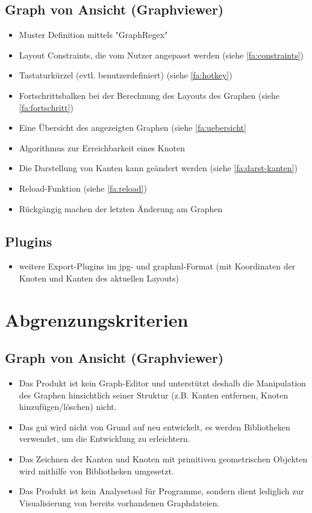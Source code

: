 \subsection{Graph von Ansicht (Graphviewer)}
  \begin{itemize}
    \item Muster Definition mittels "GraphRegex" %
    \item Layout Constraints, die vom Nutzer angepasst werden (siehe \ref{fa:constraints}) %
    \item Tastaturkürzel (evtl. benutzerdefiniert) (siehe \ref{fa:hotkey})
    \item Fortschrittsbalken bei der Berechnung des Layouts des Graphen (siehe \ref{fa:fortschritt})
    \item Eine Übersicht des angezeigten Graphen (siehe \ref{fa:uebersicht}
    \item Algorithmus zur Erreichbarkeit eines Knoten %
    \item Die Darstellung von Kanten kann geändert werden (siehe \ref{fa:darst-kanten})
    \item Reload-Funktion (siehe \ref{fa:reload})
    \item Rückgängig machen der letzten Änderung am Graphen %
  \end{itemize}

\subsection{Plugins}
  \begin{itemize}
    \item weitere Export-Plugins im \gls{jpg}- und \gls{graphml}-Format (mit Koordinaten der Knoten und Kanten des aktuellen Layouts)
  \end{itemize}
  
\section{Abgrenzungskriterien}

\subsection{Graph von Ansicht (Graphviewer)}
  \begin{itemize}
    \item Das Produkt ist kein Graph-Editor und unterstützt deshalb die Manipulation des Graphen hinsichtlich seiner Struktur (z.B. Kanten entfernen, Knoten hinzufügen/löschen) nicht.
    \item Das \gls{gui} wird nicht von Grund auf neu entwickelt, es werden Bibliotheken verwendet, um die Entwicklung zu erleichtern.
    \item Das Zeichnen der Kanten und Knoten mit primitiven geometrischen Objekten wird mithilfe von Bibliotheken umgesetzt. %
    \item Das Produkt ist kein Analysetool für Programme, sondern dient lediglich zur Visualisierung von bereits vorhandenen Graphdateien.
  \end{itemize}
